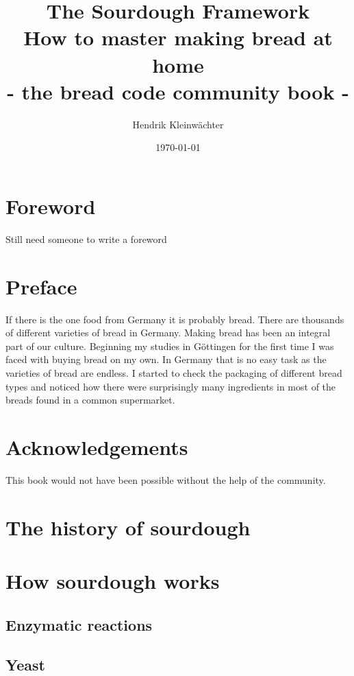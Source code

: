 \documentclass[a4paper, 12pt]{book}
\title{%
  The Sourdough Framework\\
  \large How to master making bread at home\\
  \small - the bread code community book -}
\author{Hendrik Kleinwächter}
\date{\today}
\begin{document}
\begin{titlepage}
\maketitle
\end{titlepage}


\frontmatter

\tableofcontents

\chapter{Foreword}

Still need someone to write a foreword

\chapter{Preface}

If there is the one food from Germany it is probably bread. There are thousands
of different varieties of bread in Germany. Making bread has been an integral part
of our culture. Beginning my studies in Göttingen for the first time I was faced
with buying bread on my own. In Germany that is no easy task
as the varieties of bread are endless. I started to check the packaging
of different bread types and noticed how there were surprisingly
many ingredients in most of the breads found in a common supermarket.


\chapter{Acknowledgements}

This book would not have been possible without the help of the community.


\mainmatter

\chapter{The history of sourdough}

\chapter{How sourdough works}
\section{Enzymatic reactions}
\section{Yeast}
\end{document}
